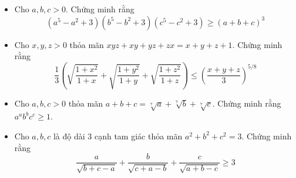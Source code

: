 \documentclass[11pt]{scrartcl}
\begin{document}
\begin{itemize}[label=, leftmargin=0em, itemsep=0.5em]
        \item \begin{btvn}
            Cho $a,b,c >0$. Chứng minh rằng
            \[
                (a^5 - a^2 + 3)(b^5 - b^2 + 3)(c^5 - c^2 + 3) \geq (a + b + c)^3
            \]
        \end{btvn}
        \item \begin{btvn}
            Cho $x,y,z >0$ thỏa mãn $xyz + xy + yz + zx  = x + y + z + 1$. Chứng minh rằng
            \[
                \frac{1}{3}\left(\sqrt{\frac{1 + x^2}{1 + x}} + \sqrt{\frac{1 + y^2}{1 + y}} + \sqrt{\frac{1 + z^2}{1 + z}}\right) \leq \left(\frac{x + y + z}{3}\right)^{5/8}
            \]
        \end{btvn}
        \item \begin{btvn}
            Cho $a,b,c > 0$ thỏa mãn $a + b + c = \sqrt[7]{a} + \sqrt[7]{b} + \sqrt[7]{c}$. Chứng minh rằng $a^ab^bc^c \geq 1$.
        \end{btvn}
        \item\begin{btvn}
            Cho $a,b,c$ là độ dài 3 cạnh tam giác thỏa mãn $a^2 + b^2 + c^2 = 3$. Chứng minh rằng
            \[
                \frac{a}{\sqrt{b + c -a}} + \frac{b}{\sqrt{c + a -b}} + \frac{c}{\sqrt{a + b -c}} \geq 3
            \]
            

\end{btvn}
\end{itemize}
\end{document}
